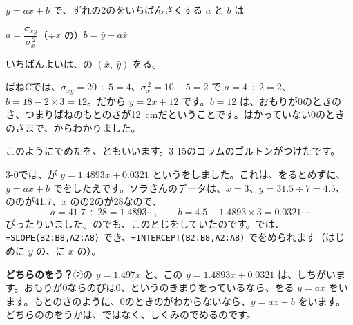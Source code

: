 \begin{taisetsu}
$y=ax+b$ で、ずれの2のをいちばんさくする $a$ と $b$ は\par
\hfill $a=\dfrac{\sigma_{xy}}{\sigma_x^{\,2}}$（÷$x$ の）\qquad $b=\bar{y}-a\bar{x}$\hfill\null\par
いちばんよいは、の $(\bar{x},\ \bar{y})$ をる。
\end{taisetsu}

ばねCでは、$\sigma_{xy}=20\div5=4$、$\sigma_x^{\,2}=10\div5=2$ で $a=4\div2=2$、$b=18-2\times3=12$。だから $y=2x+12$ です。$b=12$ は、おもりが0のときのさ、つまりばねのもとのさが\qty{12}{cm}だということです。はかっていない0のときのさまで、からわかりました。

このようにでめたを、\textbf{}ともいいます。3-15のコラムのゴルトンがつけたです。

3-0では、が $y=1.4893x+0.0321$ というをしました。これは、をるとめずに、$y=ax+b$ でをしたえです。ソラさんのデータは、$\bar{x}=3$、$\bar{y}=31.5\div7=4.5$、ののが41.7、$x$ のの2のが28なので、
\[ a=41.7\div28=1.4893\cdots,\qquad b=4.5-1.4893\times3=0.0321\cdots \]
ぴったりいました。のでも、このとじをしていたのです。では、\texttt{=SLOPE(B2:B8,A2:A8)} でき、\texttt{=INTERCEPT(B2:B8,A2:A8)} でをめられます（はじめに $y$ の、に $x$ の）。

\textbf{どちらのをう？}\quad ②の $y=1.497x$ と、この $y=1.4893x+0.0321$ は、しちがいます。おもりが0ならのびは0、というのきまりをっているなら、をる $y=ax$ をいます。もとのさのように、0のときのがわからないなら、$y=ax+b$ をいます。どちらののをうかは、ではなく、しくみのでめるのです。

